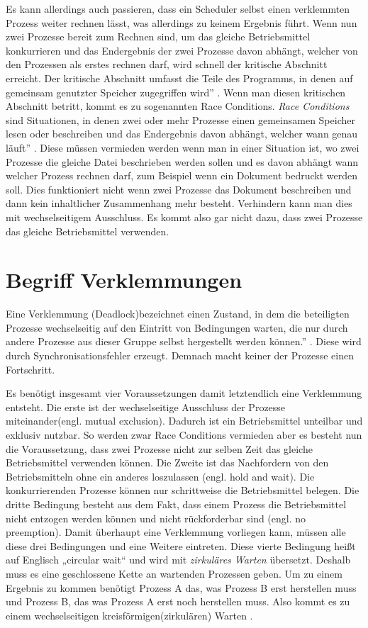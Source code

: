 Es kann allerdings auch passieren, dass ein Scheduler selbst einen verklemmten Prozess weiter rechnen lässt, was allerdings zu keinem Ergebnis führt.
Wenn nun zwei Prozesse bereit zum Rechnen sind, um das gleiche Betriebsmittel konkurrieren und das Endergebnis der zwei Prozesse davon abhängt, welcher von den Prozessen als erstes rechnen darf, wird schnell der kritische Abschnitt erreicht. Der kritische Abschnitt umfasst \glqq die Teile des Programms, in denen auf gemeinsam genutzter Speicher zugegriffen wird'' \parencite[S. 164]{tanenbaum2016}. Wenn man diesen kritischen Abschnitt betritt, kommt es zu sogenannten Race Conditions. \textit{Race Conditions} sind Situationen, \glqq in denen zwei oder mehr Prozesse einen gemeinsamen Speicher lesen oder beschreiben und das Endergebnis davon abhängt, welcher wann genau läuft'' \parencite[S. 166 f.]{tanenbaum2016}. Diese müssen vermieden werden wenn man in einer Situation ist, wo zwei Prozesse die gleiche Datei beschrieben werden sollen und es davon abhängt wann welcher Prozess rechnen darf, zum Beispiel wenn ein Dokument bedruckt werden soll. Dies funktioniert nicht wenn zwei Prozesse das Dokument beschreiben und dann kein inhaltlicher Zusammenhang mehr besteht. Verhindern kann man dies mit wechselseitigem Ausschluss. Es kommt also gar nicht dazu, dass zwei Prozesse das gleiche Betriebsmittel verwenden.

\section{Begriff Verklemmungen}
\glqq Eine Verklemmung (Deadlock)bezeichnet einen Zustand, in dem die beteiligten Prozesse wechselseitig auf den Eintritt von Bedingungen warten, die nur durch andere Prozesse aus dieser Gruppe selbst hergestellt werden können.'' \parencite[S.248]{sturm2001}. Diese wird durch Synchronisationsfehler erzeugt. 
Demnach macht keiner der Prozesse einen Fortschritt.

Es benötigt insgesamt vier Voraussetzungen damit letztendlich eine Verklemmung entsteht. Die erste ist der wechselseitige Ausschluss der Prozesse miteinander(engl. mutual exclusion). Dadurch ist ein Betriebsmittel unteilbar und exklusiv nutzbar. So werden zwar Race Conditions vermieden aber es besteht nun die Voraussetzung, dass zwei Prozesse nicht zur selben Zeit das gleiche Betriebsmittel verwenden können. Die Zweite ist das Nachfordern von den Betriebsmitteln ohne ein anderes loszulassen (engl. hold and wait). Die konkurrierenden Prozesse können nur schrittweise die Betriebsmittel belegen. Die dritte Bedingung besteht aus dem Fakt, dass einem Prozess die Betriebsmittel nicht entzogen werden können und nicht rückforderbar sind (engl. no preemption). Damit überhaupt eine Verklemmung vorliegen kann, müssen alle diese drei Bedingungen und eine Weitere eintreten. Diese vierte Bedingung heißt auf Englisch „circular wait“ und wird mit \textit{zirkuläres Warten} übersetzt. Deshalb muss es eine geschlossene Kette an wartenden Prozessen geben. Um zu einem Ergebnis zu kommen benötigt Prozess A das, was Prozess B erst herstellen muss und Prozess B, das was Prozess A erst noch herstellen muss. Also kommt es zu einem wechselseitigen kreisförmigen(zirkulären) Warten \parencite[vgl.][S. 195f.]{baun2017}.

